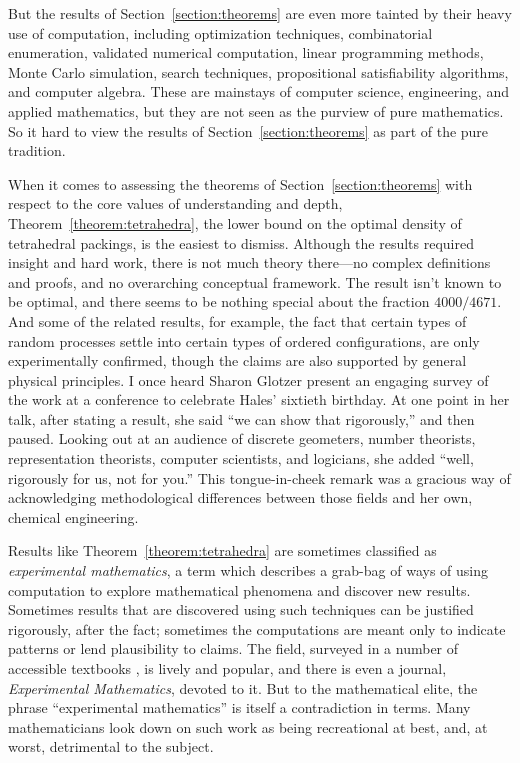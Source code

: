 \documentclass{amsart}
\theoremstyle{definition}
\theoremstyle{remark}
\numberwithin{equation}{section}
\begin{document}
But the results of Section~\ref{section:theorems} are even more tainted by their heavy use of computation, including optimization techniques, combinatorial enumeration, validated numerical computation, linear programming methods, Monte Carlo simulation, search techniques, propositional satisfiability algorithms, and computer algebra. These are mainstays of computer science, engineering, and applied mathematics, but they are not seen as the purview of pure mathematics. So it hard to view the results of Section~\ref{section:theorems} as part of the pure tradition.

When it comes to assessing the theorems of Section~\ref{section:theorems} with respect to the core values of understanding and depth, Theorem~\ref{theorem:tetrahedra}, the lower bound on the optimal density of tetrahedral packings, is the easiest to dismiss. Although the results required insight and hard work, there is not much theory there---no complex definitions and proofs, and no overarching conceptual framework. The result isn't known to be optimal, and there seems to be nothing special about the fraction $4000/4671$. And some of the related results, for example, the fact that certain types of random processes settle into certain types of ordered configurations, are only experimentally confirmed, though the claims are also supported by general physical principles. I once heard Sharon Glotzer present an engaging survey of the work at a conference to celebrate Hales' sixtieth birthday. At one point in her talk, after stating a result, she said ``we can show that rigorously,'' and then paused. Looking out at an audience of discrete geometers, number theorists, representation theorists, computer scientists, and logicians, she added ``well, rigorously for us, not for you.'' This tongue-in-cheek remark was a gracious way of acknowledging methodological differences between those fields and her own, chemical engineering.

Results like Theorem~\ref{theorem:tetrahedra} are sometimes classified as \emph{experimental mathematics}, a term which describes a grab-bag of ways of using computation to explore mathematical phenomena and discover new results. Sometimes results that are discovered using such techniques can be justified rigorously, after the fact; sometimes the computations are meant only to indicate patterns or lend plausibility to claims. The field, surveyed in a number of accessible textbooks \cite{borwein:bailey:08,borwein:devlin:09}, is lively and popular, and there is even a journal, \emph{Experimental Mathematics}, devoted to it. But to the mathematical elite, the phrase ``experimental mathematics'' is itself a contradiction in terms. Many mathematicians look down on such work as being recreational at best, and, at worst, detrimental to the subject.
\end{document}
